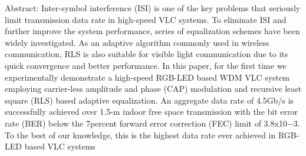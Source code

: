 	\cite{4.5g-fudan}
	Abstract: Inter-symbol interference (ISI) is one of the key problems that
	seriously limit transmission data rate in high-speed VLC systems. To
	eliminate ISI and further improve the system performance, series of
	equalization schemes have been widely investigated. As an adaptive
	algorithm commonly used in wireless communication, RLS is also suitable
	for visible light communication due to its quick convergence and better
	performance. In this paper, for the first time we experimentally demonstrate
	a high-speed RGB-LED based WDM VLC system employing carrier-less
	amplitude and phase (CAP) modulation and recursive least square (RLS)
	based adaptive equalization. An aggregate data rate of 4.5Gb/s is
	successfully achieved over 1.5-m indoor free space transmission with the bit error rate (BER) below the 7percent forward error correction (FEC) limit of 3.8x10−3. To the best of our knowledge, this is the highest data rate ever
	achieved in RGB-LED based VLC systems